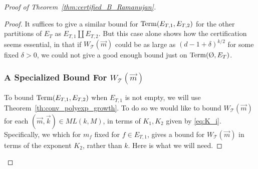 \documentclass{memo-l}
\theoremstyle{plain}
\theoremstyle{definition}
\numberwithin{section}{chapter}
\numberwithin{equation}{chapter}
\renewcommand{\emptyset}{\text{\O}}
\theoremstyle{plain}
\theoremstyle{definition}
\newcommand\cT{\mathcal{T}}
\begin{document}
\begin{proof}[Proof of Theorem~\ref{thm:certified_B_Ramanujan}]
\begin{proof}
It suffices to give a similar bound for ${\rm Term}(E_{T,1},E_{T,2})$ for
the other partitions of $E_T$ as $E_{T,1}\amalg E_{T,2}$.  But this case
alone shows how the certification seems essential, in that if $W_\cT(\vec
m)$ could be as large as $(d-1+\delta)^{k/2}$ for some fixed $\delta>0$, we
could not give a good enough bound just on ${\rm Term}(\emptyset,E_T)$.


\subsubsection*{A Specialized Bound For $W_\cT(\vec m)$}

To bound ${\rm Term}(E_{T,1},E_{T,2})$ when $E_{T,1}$ is not empty, we will
use Theorem~\ref{th:conv_polyexp_growth}.  To do so we would like to bound
$W_\cT(\vec m)$ for each $(\vec m,\vec k)\in ML(k,M)$, in terms of
$K_1,K_2$ given by \eqref{eq:K_i}.  Specifically, we which for $m_f$ fixed
for $f\in E_{T,1}$, gives a bound for $W_\cT(\vec m)$ in terms of the
exponent $K_2$, rather than $k$.  Here is what we will need.


\end{proof}
\end{proof}
\end{document}
